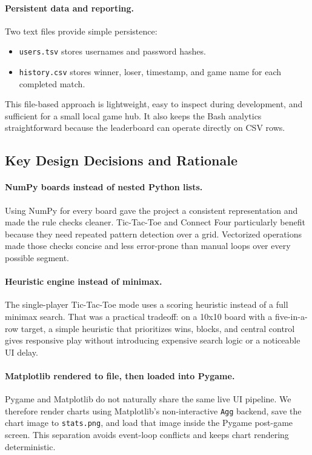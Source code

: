 \documentclass[12pt,a4paper]{article}
\begin{document}
\paragraph{Persistent data and reporting.}
Two text files provide simple persistence:

\begin{itemize}[leftmargin=*]
    \item \texttt{users.tsv} stores usernames and password hashes.
    \item \texttt{history.csv} stores winner, loser, timestamp, and game name for each completed match.
\end{itemize}

This file-based approach is lightweight, easy to inspect during development, and sufficient for a small local game hub. It also keeps the Bash analytics straightforward because the leaderboard can operate directly on CSV rows.

\subsection{Key Design Decisions and Rationale}

\paragraph{NumPy boards instead of nested Python lists.}
Using NumPy for every board gave the project a consistent representation and made the rule checks cleaner. Tic-Tac-Toe and Connect Four particularly benefit because they need repeated pattern detection over a grid. Vectorized operations made those checks concise and less error-prone than manual loops over every possible segment.

\paragraph{Heuristic engine instead of minimax.}
The single-player Tic-Tac-Toe mode uses a scoring heuristic instead of a full minimax search. That was a practical tradeoff: on a 10x10 board with a five-in-a-row target, a simple heuristic that prioritizes wins, blocks, and central control gives responsive play without introducing expensive search logic or a noticeable UI delay.

\paragraph{Matplotlib rendered to file, then loaded into Pygame.}
Pygame and Matplotlib do not naturally share the same live UI pipeline. We therefore render charts using Matplotlib's non-interactive \texttt{Agg} backend, save the chart image to \texttt{stats.png}, and load that image inside the Pygame post-game screen. This separation avoids event-loop conflicts and keeps chart rendering deterministic.
\end{document}
